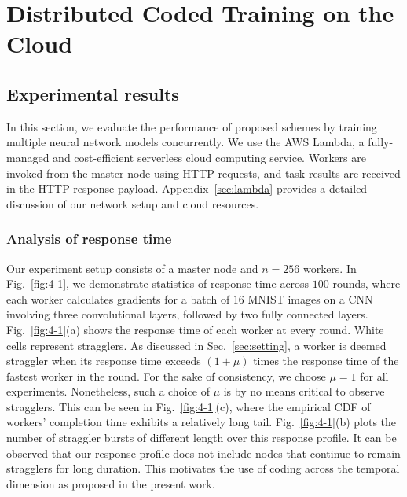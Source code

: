 \chapter{Distributed Coded Training on the Cloud} \label{ch-2}



\section{Experimental results}
\label{sec:experiments}

In this section, we evaluate the performance of proposed schemes by training multiple neural network models concurrently. We use the AWS Lambda,
a fully-managed and cost-efficient serverless cloud computing service. Workers are invoked from the master node using HTTP requests, and task results are received in the HTTP response payload. Appendix~\ref{sec:lambda} provides a detailed discussion of our network setup and cloud resources.

\subsection{Analysis of response time}
\label{subsec:response-time}

Our experiment setup consists of a master node and $n=256$ workers. In Fig.~\ref{fig:4-1}, we demonstrate statistics of response time across $100$ rounds, where each worker calculates gradients for a batch of $16$ MNIST images on a CNN involving three convolutional layers, followed by two fully connected layers.  Fig.~\ref{fig:4-1}(a) shows the response time of each worker at every round. White cells represent stragglers. As discussed in Sec.~\ref{sec:setting}, a worker is deemed straggler when its response time exceeds $(1+\mu)$ times the response time of the fastest worker in the round. For the sake of consistency, we choose $\mu=1$ for all experiments. Nonetheless, such a choice of $\mu$ is by no means critical to observe stragglers. This can be seen in Fig.~\ref{fig:4-1}(c), where the empirical CDF of workers' completion time exhibits a relatively long tail. Fig.~\ref{fig:4-1}(b) plots the number of straggler bursts of different length over this response profile. It can be observed that our response profile does not include nodes that continue to remain stragglers for long duration. This motivates the use of coding across the temporal dimension as proposed in the present work.


